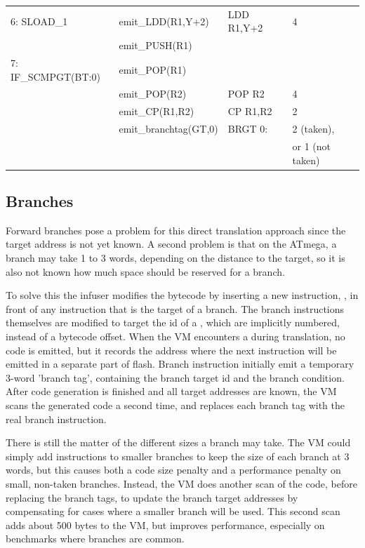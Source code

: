 \begin{table}
\begin{tabular}{llll}
    6: SLOAD\_1         & emit\_LDD(R1,Y+2)                  & LDD R1,Y+2 & 4 \\
                        & emit\_PUSH(R1)                     &            & \\
    7: IF\_SCMPGT(BT:0) & emit\_POP(R1)                      &            & \\
                        & emit\_POP(R2)                      & POP R2     & 4 \\
                        & emit\_CP(R1,R2)                    & CP R1,R2   & 2 \\
                        & emit\_branchtag(GT,0)              & BRGT 0:    & 2 (taken), \\
                        &                                    &            & or 1 (not taken) \\
    \bottomrule
    \end{tabular}
\end{table}

\subsection{Branches}
Forward branches pose a problem for this direct translation approach since the target address is not yet known. A second problem is that on the ATmega, a branch may take 1 to 3 words, depending on the distance to the target, so it is also not known how much space should be reserved for a branch.

To solve this the infuser modifies the bytecode by inserting a new instruction, , in front of any instruction that is the target of a branch. The branch instructions themselves are modified to target the id of a , which are implicitly numbered, instead of a bytecode offset. When the VM encounters a  during translation, no code is emitted, but it records the address where the next instruction will be emitted in a separate part of flash. Branch instruction initially emit a temporary 3-word 'branch tag', containing the branch target id and the branch condition. After code generation is finished and all target addresses are known, the VM scans the generated code a second time, and replaces each branch tag with the real branch instruction.

There is still the matter of the different sizes a branch may take. The VM could simply add  instructions to smaller branches to keep the size of each branch at 3 words, but this causes both a code size penalty and a performance penalty on small, non-taken branches. Instead, the VM does another scan of the code, before replacing the branch tags, to update the branch target addresses by compensating for cases where a smaller branch will be used. This second scan adds about 500 bytes to the VM, but improves performance, especially on benchmarks where branches are common.


